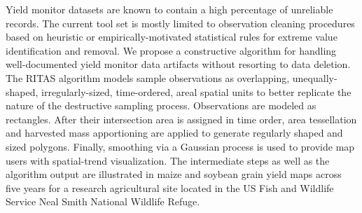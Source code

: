 
Yield monitor datasets are known to contain a high percentage of
unreliable records. The current tool set is mostly limited to
observation cleaning procedures based on heuristic or
empirically-motivated statistical rules for extreme value
identification and removal. We propose a constructive algorithm for
handling well-documented yield monitor data artifacts without
resorting to data deletion. The RITAS algorithm models sample
observations as overlapping, unequally-shaped, irregularly-sized,
time-ordered, areal spatial units to better replicate the nature of
the destructive sampling process. Observations are modeled as
rectangles. After their intersection area is assigned in time order,
area tessellation and harvested mass apportioning are applied to
generate regularly shaped and sized polygons. Finally, smoothing via a
Gaussian process is used to provide map users with spatial-trend
visualization. The intermediate steps as well as the algorithm output
are illustrated in maize and soybean grain yield maps across five
years for a research agricultural site located in the US Fish and
Wildlife Service Neal Smith National Wildlife Refuge.

